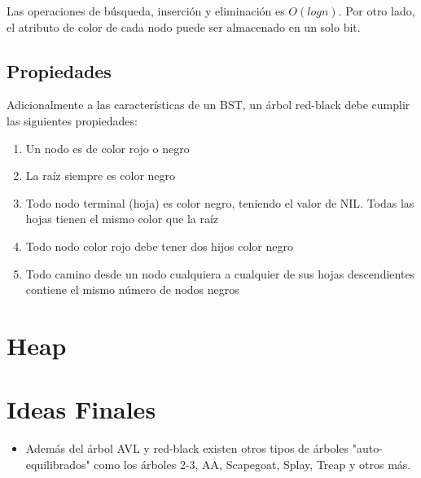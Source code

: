 Las operaciones de búsqueda, inserción y eliminación es $O(logn)$. Por otro lado, el atributo de color de cada nodo puede ser almacenado en un solo bit.
\subsection{Propiedades}

Adicionalmente a las características de un BST, un árbol red-black debe cumplir las siguientes propiedades:
\begin{enumerate}
\item Un nodo es de color rojo o negro
\item La raíz siempre es color negro
\item Todo nodo terminal (hoja) es color negro, teniendo el valor de NIL. Todas las hojas tienen el mismo color que la raíz
\item Todo nodo color rojo debe tener dos hijos color negro
\item Todo camino desde un nodo cualquiera a cualquier de sus hojas descendientes contiene el mismo número de nodos negros
\end{enumerate}

\section{Heap}

\section{Ideas Finales}
\begin{itemize}
\item Además del árbol AVL y red-black existen otros tipos de árboles "auto-equilibrados" como los árboles 2-3, AA, Scapegoat, Splay, Treap y otros más.
\end{itemize}